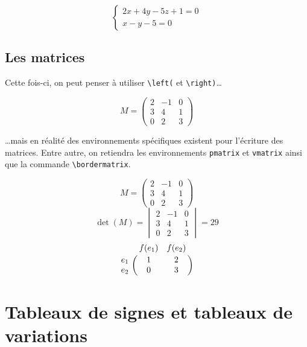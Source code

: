 \begin{SideBySideExample}
    \[\begin{cases}
    2x+4y-5z+1=0\\
    x-y-5=0
    \end{cases}\]
\end{SideBySideExample}


\subsection{Les matrices}

Cette fois-ci, on peut penser à utiliser \verb!\left(! et \verb!\right)!\dots\bigskip

\begin{SideBySideExample}
    \[M = \left(
    	\begin{array}{ccc}
    		2 & -1 & 0 \\
            3 & 4 & 1 \\
            0 & 2 & 3
    	\end{array}
    \right)\]
\end{SideBySideExample}
\bigskip

\dots mais en réalité des environnements spécifiques existent pour l'écriture des matrices. Entre autre, on retiendra les environnements \texttt{pmatrix} et \texttt{vmatrix} ainsi que la commande \texttt{\textbackslash bordermatrix}.\bigskip

\begin{SideBySideExample}
    \[M =
    	\begin{pmatrix}
    		2 & -1 & 0 \\
            3 & 4 & 1 \\
            0 & 2 & 3
    	\end{pmatrix}
    \]\medskip
    \[\det(M) =
    	\begin{vmatrix}
    		2 & -1 & 0 \\
            3 & 4 & 1 \\
            0 & 2 & 3
    	\end{vmatrix} = 29
    \]\medskip
    \[
        \bordermatrix{
            & f(e_1) & f(e_2) \cr
        e_1 & 1 & 2 \cr
        e_2 & 0 & 3 \cr}
    \]
\end{SideBySideExample}
\bigskip

\section{Tableaux de signes et tableaux de variations}


